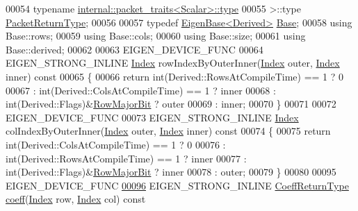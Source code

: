\begin{DoxyCode}
00054                          \textcolor{keyword}{typename} \hyperlink{group___sparse_core___module}{internal::packet\_traits<Scalar>::type}
00055                      >::type \hyperlink{class_eigen_1_1internal_1_1_tensor_lazy_evaluator_writable}{PacketReturnType};
00056 
00057     \textcolor{keyword}{typedef} \hyperlink{group___core___module_struct_eigen_1_1_eigen_base}{EigenBase<Derived>} \hyperlink{group___core___module_struct_eigen_1_1_eigen_base}{Base};
00058     \textcolor{keyword}{using} Base::rows;
00059     \textcolor{keyword}{using} Base::cols;
00060     \textcolor{keyword}{using} Base::size;
00061     \textcolor{keyword}{using} Base::derived;
00062 
00063     EIGEN\_DEVICE\_FUNC
00064     EIGEN\_STRONG\_INLINE \hyperlink{group___core___module_a554f30542cc2316add4b1ea0a492ff02}{Index} rowIndexByOuterInner(\hyperlink{group___core___module_a554f30542cc2316add4b1ea0a492ff02}{Index} outer, \hyperlink{group___core___module_a554f30542cc2316add4b1ea0a492ff02}{Index} inner)\textcolor{keyword}{ const}
00065 \textcolor{keyword}{    }\{
00066       \textcolor{keywordflow}{return} int(Derived::RowsAtCompileTime) == 1 ? 0
00067           : int(Derived::ColsAtCompileTime) == 1 ? inner
00068           : int(Derived::Flags)&\hyperlink{group__flags_gae4f56c2a60bbe4bd2e44c5b19cbe8762}{RowMajorBit} ? outer
00069           : inner;
00070     \}
00071 
00072     EIGEN\_DEVICE\_FUNC
00073     EIGEN\_STRONG\_INLINE \hyperlink{group___core___module_a554f30542cc2316add4b1ea0a492ff02}{Index} colIndexByOuterInner(\hyperlink{group___core___module_a554f30542cc2316add4b1ea0a492ff02}{Index} outer, \hyperlink{group___core___module_a554f30542cc2316add4b1ea0a492ff02}{Index} inner)\textcolor{keyword}{ const}
00074 \textcolor{keyword}{    }\{
00075       \textcolor{keywordflow}{return} int(Derived::ColsAtCompileTime) == 1 ? 0
00076           : int(Derived::RowsAtCompileTime) == 1 ? inner
00077           : int(Derived::Flags)&\hyperlink{group__flags_gae4f56c2a60bbe4bd2e44c5b19cbe8762}{RowMajorBit} ? inner
00078           : outer;
00079     \}
00080 
00095     EIGEN\_DEVICE\_FUNC
\hyperlink{group___core___module_ad41647ef695f9a5a58a9a0f50e2ae064}{00096}     EIGEN\_STRONG\_INLINE \hyperlink{class_eigen_1_1internal_1_1_tensor_lazy_evaluator_writable}{CoeffReturnType} \hyperlink{group___core___module_ad41647ef695f9a5a58a9a0f50e2ae064}{coeff}(\hyperlink{group___core___module_a554f30542cc2316add4b1ea0a492ff02}{Index} row, 
      \hyperlink{group___core___module_a554f30542cc2316add4b1ea0a492ff02}{Index} col)\textcolor{keyword}{ const}

\end{DoxyCode}
